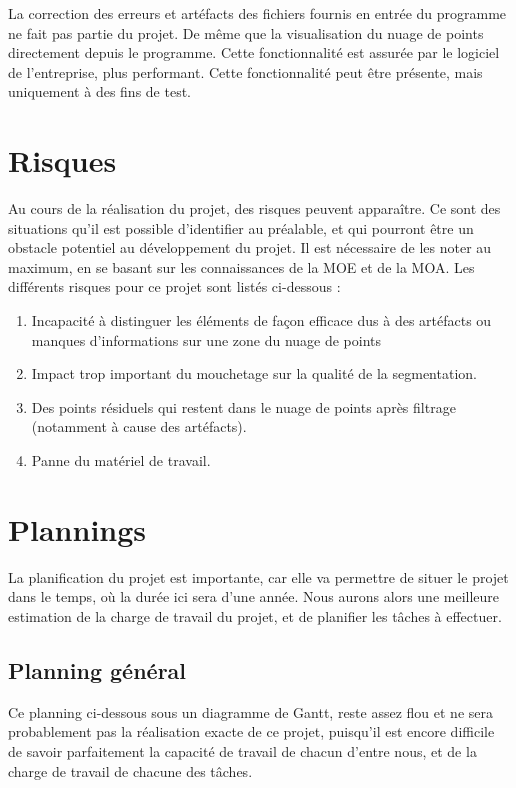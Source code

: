 \documentclass[12pt,titlepage,french]{article}
\begin{document}
La correction des erreurs et artéfacts des fichiers fournis en entrée du programme ne fait pas partie du projet.
De même que la visualisation du nuage de points directement depuis le programme. Cette fonctionnalité est assurée par le logiciel de l'entreprise, plus performant. Cette fonctionnalité peut être présente, mais uniquement à des fins de test.

\section{Risques}

Au cours de la réalisation du projet, des risques peuvent apparaître. Ce sont des situations qu'il est possible d'identifier au préalable, et qui pourront être un obstacle potentiel au développement du projet. Il est nécessaire de les noter au maximum, en se basant sur les connaissances de la MOE et de la MOA. Les différents risques pour ce projet sont listés ci-dessous :
\begin{enumerate}
\item Incapacité à distinguer les éléments de façon efficace dus à des artéfacts ou manques d'informations sur une zone du nuage de points
\item Impact trop important du mouchetage sur la qualité de la segmentation.
\item Des points résiduels qui restent dans le nuage de points après filtrage (notamment à cause des artéfacts).
\item Panne du matériel de travail.
\end{enumerate}

\section{Plannings}

La planification du projet est importante, car elle va permettre de situer le projet dans le temps, où la durée ici sera d'une année. Nous aurons alors une meilleure estimation de la charge de travail du projet, et de planifier les tâches à effectuer. 

\subsection*{Planning général}

Ce planning ci-dessous sous un diagramme de Gantt, reste assez flou et ne sera probablement pas la réalisation exacte de ce projet, puisqu'il est encore difficile de savoir parfaitement la capacité de travail de chacun d'entre nous, et de la charge de travail de chacune des tâches.
\end{document}
